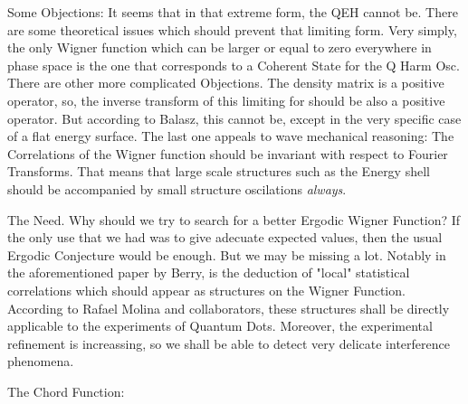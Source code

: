 Some Objections:
It seems that in that extreme form, the QEH cannot be. There are some
theoretical issues which should prevent that limiting form.
Very simply, the only Wigner function which can be larger or equal to zero
everywhere in phase space is the one that corresponds to a Coherent State
for the Q Harm Osc. 
There are other more complicated Objections. The density matrix is 
a positive operator, so, the inverse transform of this limiting for
should be also a positive operator. But according to Balasz, this cannot be,
except in the very specific case of a flat energy surface.
The last one appeals to wave mechanical reasoning: The Correlations of
the Wigner function should be invariant with respect to Fourier Transforms.
That means that large scale structures such as the Energy shell should be
accompanied by small structure oscilations \emph{always}.


The Need.
Why should we try to search for a better Ergodic Wigner Function?
If the only use that we had was to give adecuate expected values,
then the usual Ergodic Conjecture would be enough. But we may be missing
a lot.  Notably in the aforementioned paper by Berry, is the deduction
of "local" statistical correlations which should appear as structures on
the Wigner Function. According to Rafael Molina and collaborators, these
structures shall be directly applicable to the experiments of Quantum Dots. 
Moreover, the experimental refinement is increassing, so we shall be able
to detect very delicate interference phenomena.

The Chord Function:



                